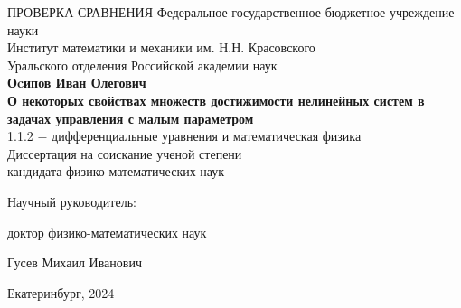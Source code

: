 \documentclass[../main.tex]{subfiles}
\begin{document}
	\begin{titlepage}
	    \begin{center}
		ПРОВЕРКА СРАВНЕНИЯ
		\large{Федеральное государственное бюджетное учреждение науки} \\
		\large{Институт математики и механики им. Н.Н. Красовского} \\ 
		\large{Уральского отделения Российской академии наук} \\ 
        \vspace*{4cm}
		\large{\textbf{Оcипов Иван Олегович}}\\
		\vspace*{1cm}
		\Large{\textbf{О некоторых свойствах множеств достижимости нелинейных систем в задачах управления с малым параметром}}\\
		\vspace*{1cm}
		\large{1.1.2 $-$ дифференциальные уравнения и математическая физика}\\
		\vspace*{1cm}
		\large{Диссертация на соискание ученой степени \\
		кандидата физико-математических наук}\\
		\end{center}
	    \vspace*{3cm}
	    
		\hspace*{82mm}\large{Научный руководитель:}

		\hspace*{82mm}\large{доктор физико-математических наук} 

		\hspace*{82mm}\large{Гусев Михаил Иванович}
		
		\vspace*{\fill}
		\begin{center}
	    \large{Екатеринбург, 2024}
	    \end{center}
	\end{titlepage}
\end{document}
